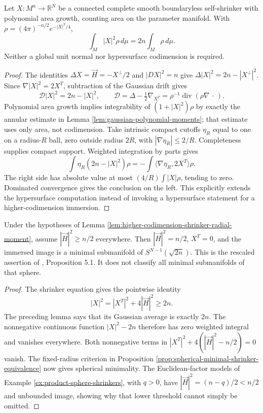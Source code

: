 \begin{lemma}\label{lem:higher-codimension-shrinker-radial-moment}
Let $X:M^n\to\mathbb R^N$ be a connected complete smooth boundaryless self-shrinker with polynomial area growth, counting area on the parameter manifold. With $\rho=(4\pi)^{-n/2}e^{-|X|^2/4}$,
\[
 \int_M |X|^2\rho\,d\mu=2n\int_M\rho\,d\mu.
\]
Neither a global unit normal nor hypersurface codimension is required.
\end{lemma}
\begin{proof}
The identities $\Delta X=\vec H=-X^\perp/2$ and $|DX|^2=n$ give $\Delta|X|^2=2n-|X^\perp|^2$. Since $\nabla|X|^2=2X^T$, subtraction of the Gaussian drift gives
\[
 \mathcal D|X|^2=2n-|X|^2,\qquad
 \mathcal D=\Delta-\tfrac12\nabla_{X^T}
 =\rho^{-1}\operatorname{div}(\rho\nabla\,\cdot\,).
\]
Polynomial area growth implies integrability of $(1+|X|^2)\rho$ by exactly the annular estimate in Lemma \ref{lem:gaussian-polynomial-moments}; that estimate uses only area, not codimension. Take intrinsic compact cutoffs $\eta_R$ equal to one on a radius-$R$ ball, zero outside radius $2R$, with $|\nabla\eta_R|\leq2/R$. Completeness supplies compact support. Weighted integration by parts gives
\[
 \int\eta_R(2n-|X|^2)\rho
 =-\int\langle\nabla\eta_R,2X^T\rangle\rho.
\]
The right side has absolute value at most $(4/R)\int|X|\rho$, tending to zero. Dominated convergence gives the conclusion on the left. This explicitly extends the hypersurface computation instead of invoking a hypersurface statement for a higher-codimension immersion.
\end{proof}

\begin{proposition}\label{prop:complete-shrinker-mean-curvature-threshold}
Under the hypotheses of Lemma \ref{lem:higher-codimension-shrinker-radial-moment}, assume $|\vec H|^2\geq n/2$ everywhere. Then $|\vec H|^2=n/2$, $X^T=0$, and the immersed image is a minimal submanifold of $S^{N-1}(\sqrt{2n})$. This is the rescaled assertion of \cite{CL12}, Proposition 5.1. It does not classify all minimal submanifolds of that sphere.
\end{proposition}
\begin{proof}
The shrinker equation gives the pointwise identity
\[
 |X|^2=|X^T|^2+4|\vec H|^2\geq2n.
\]
The preceding lemma says that its Gaussian average is exactly $2n$. The nonnegative continuous function $|X|^2-2n$ therefore has zero weighted integral and vanishes everywhere. Both nonnegative terms in $|X^T|^2+4(|\vec H|^2-n/2)=0$ vanish. The fixed-radius criterion in Proposition \ref{prop:spherical-minimal-shrinker-equivalence} now gives spherical minimality. The Euclidean-factor models of Example \ref{ex:product-sphere-shrinkers}, with $q>0$, have $|\vec H|^2=(n-q)/2<n/2$ and unbounded image, showing why that lower threshold cannot simply be omitted.
\end{proof}

